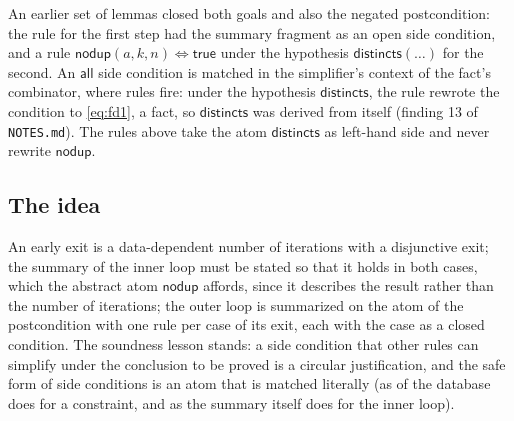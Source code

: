 An earlier set of lemmas closed both goals and also the negated postcondition: the rule for the first step
had the summary fragment as an open side condition, and a rule $\mathsf{nodup}(a, k, n) \Leftrightarrow \mathsf{true}$
under the hypothesis $\mathsf{distincts}(\ldots)$ for the second. An $\mathsf{all}$ side condition is matched
in the simplifier's context of the fact's combinator, where rules fire: under the hypothesis $\mathsf{distincts}$,
the rule rewrote the condition to \eqref{eq:fd1}, a fact, so $\mathsf{distincts}$ was derived from itself
(finding 13 of \texttt{NOTES.md}). The rules above take the atom $\mathsf{distincts}$ as left-hand side
and never rewrite $\mathsf{nodup}$.

\subsection{The idea}
An early exit is a data-dependent number of iterations with a disjunctive exit; the summary of the
inner loop must be stated so that it holds in both cases, which the abstract atom $\mathsf{nodup}$
affords, since it describes the result rather than the number of iterations; the outer loop is summarized
on the atom of the postcondition with one rule per case of its exit, each with the case as a closed
condition. The soundness lesson stands: a side condition that other rules can simplify under the conclusion
to be proved is a circular justification, and the safe form of side conditions is an atom that is matched
literally (as  of the database does for a constraint, and as the summary itself
does for the inner loop).
